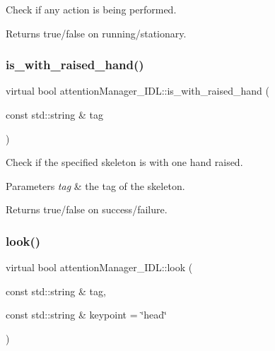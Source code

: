 Check if any action is being performed. 

\begin{DoxyReturn}{Returns}
true/false on running/stationary. 
\end{DoxyReturn}
\mbox{\label{classattentionManager__IDL_aa6b2c971be0e878ab259675c83bba2dc}} 
\subsubsection{\texorpdfstring{is\+\_\+with\+\_\+raised\+\_\+hand()}{is\_with\_raised\_hand()}}
{\footnotesize\ttfamily virtual bool attention\+Manager\+\_\+\+I\+D\+L\+::is\+\_\+with\+\_\+raised\+\_\+hand (\begin{DoxyParamCaption}\item[{const std\+::string \&}]{tag }\end{DoxyParamCaption})\hspace{0.3cm}{\ttfamily [virtual]}}



Check if the specified skeleton is with one hand raised. 


\begin{DoxyParams}{Parameters}
{\em tag} & the tag of the skeleton. \\
\hline
\end{DoxyParams}
\begin{DoxyReturn}{Returns}
true/false on success/failure. 
\end{DoxyReturn}
\mbox{\label{classattentionManager__IDL_a42941cc508bb57aa390578ecdbfde7c2}} 
\subsubsection{\texorpdfstring{look()}{look()}}
{\footnotesize\ttfamily virtual bool attention\+Manager\+\_\+\+I\+D\+L\+::look (\begin{DoxyParamCaption}\item[{const std\+::string \&}]{tag,  }\item[{const std\+::string \&}]{keypoint = {\ttfamily \char`\"{}head\char`\"{}} }\end{DoxyParamCaption})\hspace{0.3cm}{\ttfamily [virtual]}}



